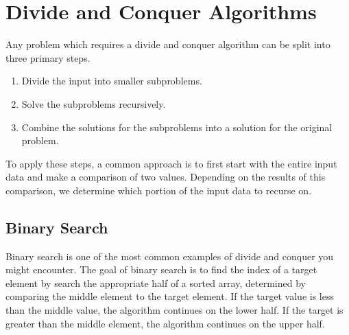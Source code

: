 \documentclass[11pt]{article}
\begin{document}
\section{Divide and Conquer Algorithms}
Any problem which requires a divide and conquer algorithm can be split into three primary steps.
\begin{enumerate}
    \item Divide the input into smaller subproblems. 
    \item Solve the subproblems recursively. 
    \item Combine the solutions for the subproblems into a solution for the original problem. 
\end{enumerate}
To apply these steps, a common approach is to first start with the entire input data and make a comparison of two values. Depending on the results of this comparison, we determine which portion of the input data to recurse on. 

\subsection{Binary Search}
Binary search is one of the most common examples of divide and conquer you might encounter. The goal of binary search is to find the index of a target element by search the appropriate half of a sorted array, determined by comparing the middle element to the target element. If the target value is less than the middle value, the algorithm continues on the lower half. If the target is greater than the middle element, the algorithm continues on the upper half. 

\IncMargin{2em}
\begin{algorithm}[H]
    \footnotesize
    \DontPrintSemicolon
    \BlankLine
\end{algorithm}\DecMargin{2em} 
\end{document}
